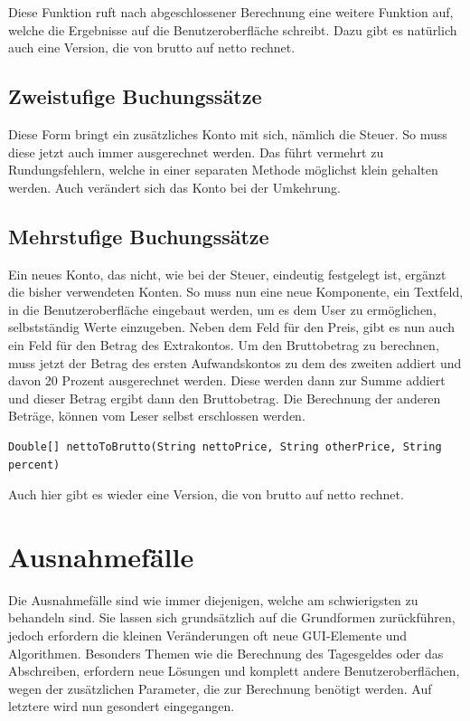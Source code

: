 \documentclass[12pt]{report}
\begin{document}
\noindent Diese Funktion ruft nach abgeschlossener Berechnung eine weitere Funktion auf, welche die Ergebnisse auf die Benutzeroberfläche schreibt. Dazu gibt es natürlich auch eine Version, die von brutto auf netto rechnet.
 
\subsection{Zweistufige Buchungssätze}
Diese Form bringt ein zusätzliches Konto mit sich, nämlich die Steuer. So muss diese jetzt auch immer ausgerechnet werden. Das führt vermehrt zu Rundungsfehlern, welche in einer separaten Methode möglichst klein gehalten werden. Auch verändert sich das Konto bei der Umkehrung. 

\subsection{Mehrstufige Buchungssätze}
Ein neues Konto, das nicht, wie bei der Steuer, eindeutig festgelegt ist, ergänzt die bisher verwendeten Konten. So muss nun eine neue Komponente, ein Textfeld, in die Benutzeroberfläche eingebaut werden, um es dem User zu ermöglichen, selbstständig Werte einzugeben. Neben dem Feld für den Preis, gibt es nun auch ein Feld für den Betrag des Extrakontos. Um den Bruttobetrag zu berechnen, muss jetzt der Betrag des ersten Aufwandskontos zu dem des zweiten addiert und davon 20 Prozent ausgerechnet werden. Diese werden dann zur Summe addiert und dieser Betrag ergibt dann den Bruttobetrag. Die Berechnung der anderen Beträge, können vom Leser selbst erschlossen werden.

\begin{lstlisting}
Double[] nettoToBrutto(String nettoPrice, String otherPrice, String percent)
\end{lstlisting}

\noindent Auch hier gibt es wieder eine Version, die von brutto auf netto rechnet.

\section{Ausnahmefälle}
Die Ausnahmefälle sind wie immer diejenigen, welche am schwierigsten zu behandeln sind. Sie lassen sich grundsätzlich auf die Grundformen zurückführen, jedoch erfordern die kleinen Veränderungen oft neue GUI-Elemente und Algorithmen. Besonders Themen wie die Berechnung des Tagesgeldes oder das Abschreiben, erfordern neue Lösungen und komplett andere Benutzeroberflächen, wegen der zusätzlichen Parameter, die zur Berechnung benötigt werden. Auf letztere wird nun gesondert eingegangen.
\end{document}
